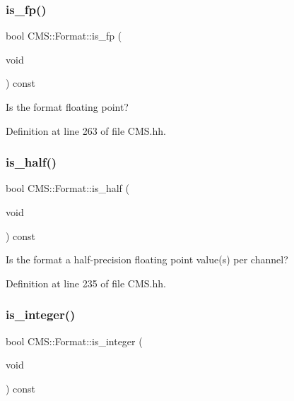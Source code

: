 \subsubsection{\texorpdfstring{is\+\_\+fp()}{is\_fp()}}
{\footnotesize\ttfamily bool C\+M\+S\+::\+Format\+::is\+\_\+fp (\begin{DoxyParamCaption}\item[{void}]{ }\end{DoxyParamCaption}) const\hspace{0.3cm}{\ttfamily [inline]}}



Is the format floating point? 



Definition at line 263 of file C\+M\+S.\+hh.

\mbox{\label{class_c_m_s_1_1_format_a5152df021f1e44e61c396e8463a94d16}} 
\subsubsection{\texorpdfstring{is\+\_\+half()}{is\_half()}}
{\footnotesize\ttfamily bool C\+M\+S\+::\+Format\+::is\+\_\+half (\begin{DoxyParamCaption}\item[{void}]{ }\end{DoxyParamCaption}) const\hspace{0.3cm}{\ttfamily [inline]}}



Is the format a half-\/precision floating point value(s) per channel? 



Definition at line 235 of file C\+M\+S.\+hh.

\mbox{\label{class_c_m_s_1_1_format_ab3e8a623c435f878411175d6331e9e6e}} 
\subsubsection{\texorpdfstring{is\+\_\+integer()}{is\_integer()}}
{\footnotesize\ttfamily bool C\+M\+S\+::\+Format\+::is\+\_\+integer (\begin{DoxyParamCaption}\item[{void}]{ }\end{DoxyParamCaption}) const\hspace{0.3cm}{\ttfamily [inline]}}



